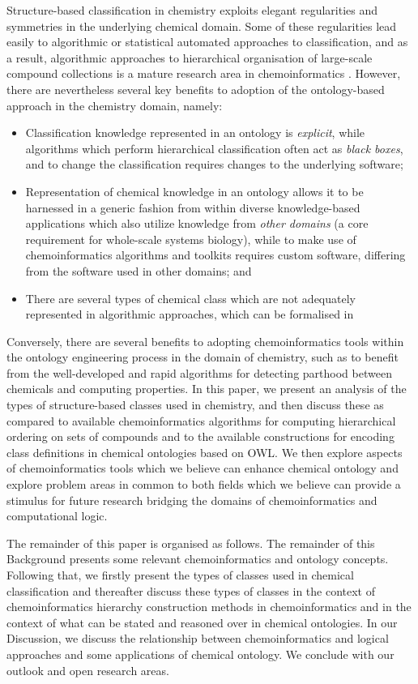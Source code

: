 \documentclass[10pt]{bmc_article}
\newenvironment{bmcformat}{\baselineskip20pt\sloppy\setboolean{publ}{false}}{\baselineskip20pt\sloppy}
\begin{document}
\begin{bmcformat}
Structure-based classification in chemistry exploits elegant regularities and symmetries in the underlying chemical domain.  Some of these regularities lead easily to algorithmic or statistical automated approaches to classification, and as a result, algorithmic approaches to hierarchical organisation of large-scale compound collections is a mature research area in chemoinformatics \cite{barnard1992,deshpande2005}. However, there are nevertheless several key benefits to adoption of the ontology-based approach in the chemistry domain, namely:
\begin{itemize}
	\item Classification knowledge represented in an ontology is \textit{explicit}, while algorithms which perform hierarchical classification often act as \textit{black boxes}, and to change the classification requires changes to the underlying software;
	\item Representation of chemical knowledge in an ontology allows it to be harnessed in a generic fashion from within diverse knowledge-based applications which also utilize knowledge from \textit{other domains} (a core requirement for whole-scale systems biology), while to make use of chemoinformatics algorithms and toolkits requires custom software, differing from the software used in other domains; and
	\item There are several types of chemical class which are not adequately represented in algorithmic approaches, which can be formalised in 
\end{itemize}

Conversely, there are several benefits to adopting chemoinformatics tools within the ontology engineering process in the domain of chemistry, such as to benefit from the well-developed and rapid algorithms for detecting parthood between chemicals and computing properties.  In this paper, we present an analysis of the types of structure-based classes used in chemistry, and then discuss these as compared to available chemoinformatics algorithms for computing hierarchical ordering on sets of compounds and to the available constructions for encoding class definitions in chemical ontologies based on OWL.  We then explore aspects of chemoinformatics tools which we believe can enhance chemical ontology and explore problem areas in common to both fields which we believe can provide a stimulus for future research bridging the domains of chemoinformatics and computational logic. 

The remainder of this paper is organised as follows. The remainder of this Background presents some relevant chemoinformatics and ontology concepts.  Following that, we firstly present the types of classes used in chemical classification and thereafter discuss these types of classes in the context of chemoinformatics hierarchy construction methods in chemoinformatics and in the context of what can be stated and reasoned over in chemical ontologies. In our Discussion, we discuss the relationship between chemoinformatics and logical approaches and some applications of chemical ontology.  We conclude with our outlook and open research areas. 




\end{bmcformat}
\end{document}
